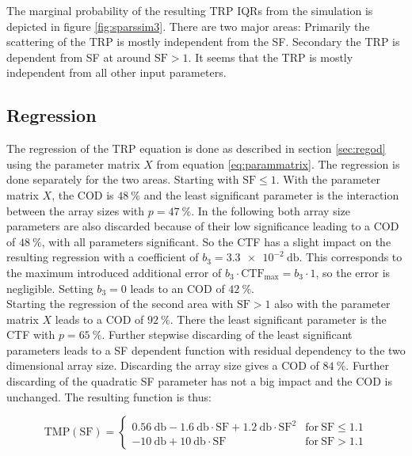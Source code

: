 The marginal probability of the resulting \ac{TRP} \acp{IQR} from the simulation is depicted in figure \ref{fig:sparssim3}. There are two major areas: Primarily the scattering of the \ac{TRP} is mostly independent from the \ac{SF}. Secondary the \ac{TRP} is dependent from \ac{SF} at around $\text{SF} > 1$. It seems that the \ac{TRP} is mostly independent from all other input parameters.

\subsection{Regression}

The regression of the \ac{TRP} equation is done as described in section \ref{sec:regod} using the parameter matrix $X$ from equation \ref{eq:parammatrix}. The regression is done separately for the two areas. Starting with $\text{SF}\le 1$. With the parameter matrix $X$, the \ac{COD} is $\SI{48}{\percent}$ and the least significant parameter is the interaction between the array sizes with $p = \SI{47}{\percent}$. In the following both array size parameters are also discarded because of their low significance leading to a \ac{COD} of $\SI{48}{\percent}$, with all parameters significant. So the \ac{CTF} has a slight impact on the resulting regression with a coefficient of $b_3=\SI{3.3e-2}{\decibel}$. This corresponds to the maximum introduced additional error of $b_3\cdot\text{CTF}_\text{max}=b_3\cdot 1$, so the error is negligible. Setting $b_3 = 0$ leads to an \ac{COD} of $\SI{42}{\percent}$.\\
Starting the regression of the second area with $\text{SF} > 1$ also with the parameter matrix $X$ leads to a \ac{COD} of $\SI{92}{\percent}$. There the least significant parameter is the \ac{CTF} with $p = \SI{65}{\percent}$. Further stepwise discarding of the least significant parameters leads to a \ac{SF} dependent function with residual dependency to the two dimensional array size. Discarding the array size gives a \ac{COD} of $\SI{84}{\percent}$. Further discarding of the quadratic \ac{SF} parameter has not a big impact and the \ac{COD} is unchanged. The resulting function is thus:

\begin{equation}
\text{TMP}\left(\text{SF}\right)=\begin{cases} 
\SI{0.56}{\decibel}-\SI{1.6}{\decibel}\cdot \text{SF}+\SI{1.2}{\decibel}\cdot\text{SF}^2 & \text{for}\ \text{SF}\le 1.1\\
\SI{-10}{\decibel}+\SI{10}{\decibel}\cdot\text{SF} & \text{for}\ \text{SF}>1.1\end{cases}
\end{equation}

